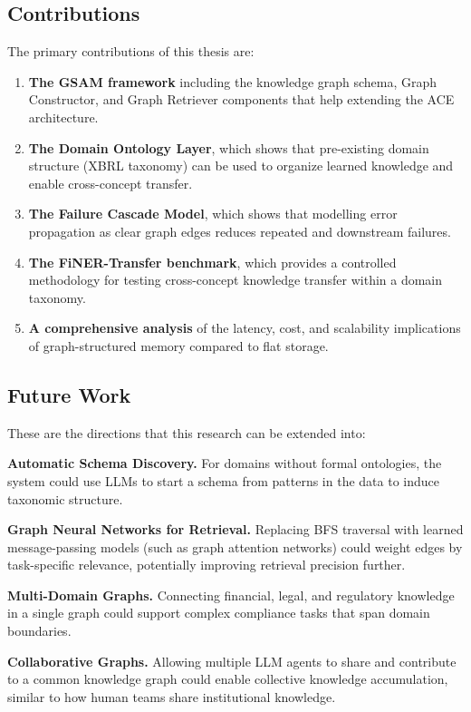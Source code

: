 \documentclass[12pt,a4paper,oneside]{article}
\begin{document}
\subsection{Contributions}

The primary contributions of this thesis are:

\begin{enumerate}
\item \textbf{The GSAM framework} including the knowledge graph schema, Graph Constructor, and Graph Retriever components that help extending the ACE architecture.
\item \textbf{The Domain Ontology Layer}, which shows that pre-existing domain structure (XBRL taxonomy) can be used to organize learned knowledge and enable cross-concept transfer.
\item \textbf{The Failure Cascade Model}, which shows that modelling error propagation as clear graph edges reduces repeated and downstream failures.
\item \textbf{The FiNER-Transfer benchmark}, which provides a controlled methodology for testing cross-concept knowledge transfer within a domain taxonomy.
\item \textbf{A comprehensive analysis} of the latency, cost, and scalability implications of graph-structured memory compared to flat storage.
\end{enumerate}

\subsection{Future Work}

These are the directions that this research can be extended into:

\textbf{Automatic Schema Discovery.} For domains without formal ontologies, the system could use LLMs to start a schema from patterns in the data to induce taxonomic structure.

\textbf{Graph Neural Networks for Retrieval.} Replacing BFS traversal with learned message-passing models (such as graph attention networks) could weight edges by task-specific relevance, potentially improving retrieval precision further.

\textbf{Multi-Domain Graphs.} Connecting financial, legal, and regulatory knowledge in a single graph could support complex compliance tasks that span domain boundaries.

\textbf{Collaborative Graphs.} Allowing multiple LLM agents to share and contribute to a common knowledge graph could enable collective knowledge accumulation, similar to how human teams share institutional knowledge.
\end{document}
